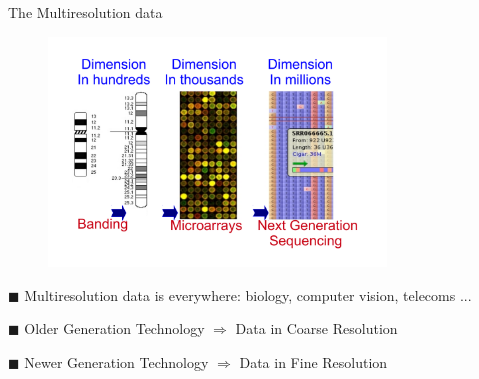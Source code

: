 \documentclass[first=dgreen,second=purple,logo=redexc]{aaltoslides}
\begin{document}
\begin{frame} {The Multiresolution data} 

\vspace{1mm}

\begin{figure}
\centering
  \includegraphics[trim=1cm 1cm 0.5cm 0.5cm, clip=true, width=0.8\textwidth]{figures/multires}
\end{figure}

\vspace{-3mm}

\footnotesize
$\blacksquare$ Multiresolution data is everywhere: biology, computer vision, telecoms ...

$\blacksquare$ Older Generation Technology $\Rightarrow$ Data in Coarse Resolution

$\blacksquare$ Newer Generation Technology $\Rightarrow$ Data in Fine Resolution

\end{frame}
% 
% 
% 
% 
% 
% 
\end{document}
